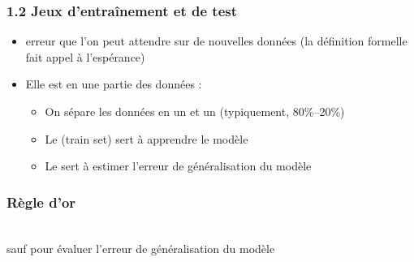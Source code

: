\begin{frame}
  \frametitle{1.2 Jeux d'entraînement et de test}
  \begin{itemize}
  \item{} erreur que l'on peut attendre sur de nouvelles
    données (la définition formelle fait appel à l'espérance)
  \pause
  \item Elle est  en 
     une partie des données :
    \begin{itemize}
    \item On sépare les données en un  et un  (typiquement, 80\%--20\%)
    \pause
    \begin{center}
    \end{center}
    \item Le  \textcolor{gray!70}{(train set)} sert à apprendre le modèle
    \item Le  sert à estimer l'erreur de généralisation du modèle
    \end{itemize}
  \end{itemize}
\end{frame}

\begin{frame}
  \frametitle{Règle d'or}
  \begin{center}
     \\ sauf pour évaluer l'erreur de généralisation du modèle
  \end{center}
\end{frame}

